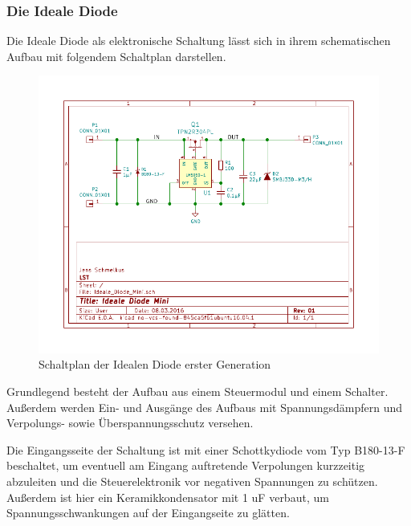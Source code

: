 \subsubsection{Die Ideale Diode} \label{Die Ideale Diode}

Die Ideale Diode als elektronische Schaltung lässt sich in ihrem schematischen Aufbau mit folgendem Schaltplan darstellen.

\begin{figure}[H]
\centering
\includegraphics[width=1.0\textwidth]{Schaltplaene/Ideale_Diode_Mini.pdf} 
\caption{Schaltplan der Idealen Diode erster Generation} 
\label{fig:Schaltplan der Idealen Diode erster Generation}
\end{figure}

Grundlegend besteht der Aufbau aus einem Steuermodul und einem Schalter. Außerdem werden Ein- und Ausgänge des Aufbaus mit Spannungsdämpfern und Verpolungs- sowie Überspannungsschutz versehen.

Die Eingangsseite der Schaltung ist mit einer Schottkydiode vom Typ B180-13-F beschaltet, um eventuell am Eingang auftretende Verpolungen kurzzeitig abzuleiten und die Steuerelektronik vor negativen Spannungen zu schützen. Außerdem ist hier ein Keramikkondensator mit 1 uF verbaut, um Spannungsschwankungen auf der Eingangseite zu glätten.


